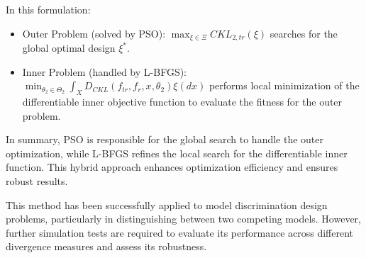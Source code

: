 In this formulation:

\begin{itemize}
\item Outer Problem (solved by PSO): $\max_{\xi\in \Xi} CKL_{2,tr}(\xi)$ searches for the global optimal design $\xi^*$.

\item Inner Problem (handled by L-BFGS): $\min_{\theta_2\in \Theta_2}\int_{X}D_{CKL}(f_{tr},f_r,x,\theta_2) \xi(dx)$ performs local minimization of the differentiable inner objective function to evaluate the fitness for the outer problem.

\end{itemize}

\hspace*{8mm} In summary, PSO is responsible for the global search to handle the outer optimization, while L-BFGS refines the local search for the differentiable inner function. This hybrid approach enhances optimization efficiency and ensures robust results.

\hspace*{8mm} This method has been successfully applied to model discrimination design problems, particularly in distinguishing between two competing models. However, further simulation tests are required to evaluate its performance across different divergence measures and assess its robustness.